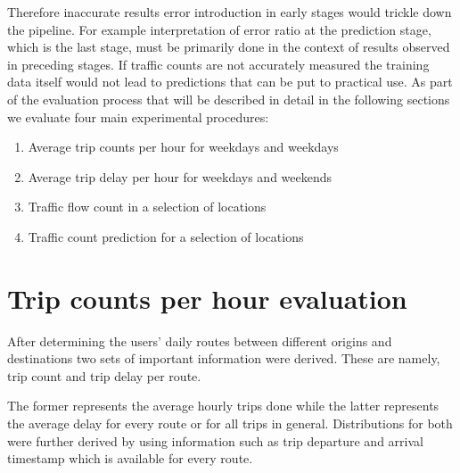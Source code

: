 \documentclass[12pt, a4paper]{report}
\theoremstyle{definition}
\theoremstyle{definition}%
\theoremstyle{definition}%
\theoremstyle{definition}%
\theoremstyle{definition}%
\theoremstyle{definition}%
\begin{document}
Therefore inaccurate results error introduction in early stages would trickle down the pipeline. For example interpretation of error ratio at the prediction stage, which is the last stage, must be primarily  done in the context of results observed in preceding stages. If traffic counts are not accurately measured the training data itself would not lead to predictions that can be put to practical use. As part of the evaluation process that will be described in detail in the following sections we evaluate four main experimental procedures:

\begin{enumerate}
	\item Average trip counts per hour for weekdays and weekdays
	\item Average trip delay per hour for weekdays and weekends
	\item Traffic flow count in a selection of locations
	\item Traffic count prediction for a selection of locations
\end{enumerate}



\section{Trip counts per hour evaluation}

After determining the users' daily routes between different origins and destinations two sets of important information were derived. These are namely, trip count and trip delay per route. 

The former represents the average hourly trips done while the latter represents the average delay for every route or for all trips in general. Distributions for both were further derived by using information such as trip departure and arrival timestamp which is available for every route. 
\end{document}
